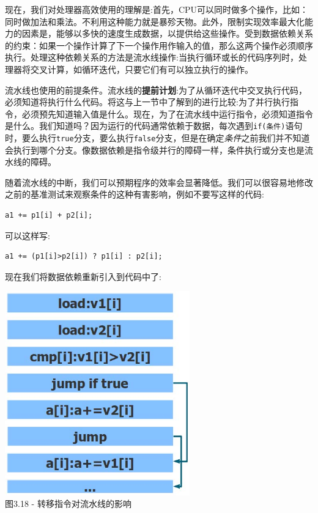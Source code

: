 现在，我们对处理器高效使用的理解是:首先，CPU可以同时做多个操作，比如：同时做加法和乘法。不利用这种能力就是暴殄天物。此外，限制实现效率最大化能力的因素是，能够以多快的速度生成数据，以提供给这些操作。受到数据依赖关系的约束：如果一个操作计算了下一个操作用作输入的值，那么这两个操作必须顺序执行。处理这种依赖关系的方法是流水线操作:当执行循环或长的代码序列时，处理器将交叉计算，如循环迭代，只要它们有可以独立执行的操作。

流水线也使用的前提条件。流水线的\textbf{提前计划}:为了从循环迭代中交叉执行代码，必须知道将执行什么代码。将这与上一节中了解到的进行比较:为了并行执行指令，必须预先知道输入值是什么。现在，为了在流水线中运行指令，必须知道指令是什么。我们知道吗？因为运行的代码通常依赖于数据，每次遇到\texttt{if(条件)}语句时，要么执行\texttt{true}分支，要么执行\texttt{false}分支，但是在确定\textit{条件}之前我们并不知道会执行到哪个分支。像数据依赖是指令级并行的障碍一样，条件执行或分支也是流水线的障碍。

随着流水线的中断，我们可以预期程序的效率会显著降低。我们可以很容易地修改之前的基准测试来观察条件的这种有害影响，例如不要写这样的代码:

\begin{lstlisting}[style=styleCXX]
a1 += p1[i] + p2[i];
\end{lstlisting}

可以这样写:

\begin{lstlisting}[style=styleCXX]
a1 += (p1[i]>p2[i]) ? p1[i] : p2[i];
\end{lstlisting}

现在我们将数据依赖重新引入到代码中了:

\begin{center}
\includegraphics[width=0.6\textwidth]{content/1/chapter3/images/18.jpg}\\
图3.18 - 转移指令对流水线的影响
\end{center}

